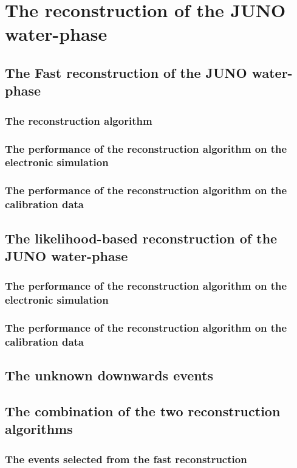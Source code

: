 \section{The reconstruction of the JUNO water-phase}
\subsection{The Fast reconstruction of the JUNO water-phase} 
\subsubsection{The reconstruction algorithm}
\subsubsection{The performance of the reconstruction algorithm on the electronic simulation}
\subsubsection{The performance of the reconstruction algorithm on the calibration data}
\subsection{The likelihood-based reconstruction of the JUNO water-phase}
\subsubsection{The performance of the reconstruction algorithm on the electronic simulation}
\subsubsection{The performance of the reconstruction algorithm on the calibration data}
\subsection{The unknown downwards events}
\subsection{The combination of the two reconstruction algorithms}
\subsubsection{The events selected from the fast reconstruction}